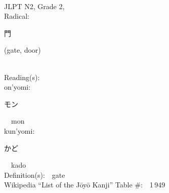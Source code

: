 \begin{multicols}{2}
{\fontsize{34pt}{40pt}  }\ \ \\  %
{JLPT N2, Grade 2, \\Radical:\ \ {\begin{CJK}{UTF8}{min} 門 \end{CJK}} (gate, door) } \\
Reading(s):\ \ \\
{\hspace*{1em}}on'yomi:\ \ \\
{\hspace*{2em}}{\begin{CJK}{UTF8}{min} モン \end{CJK}}\ \ mon\ \ \\
{\hspace*{1em}}kun'yomi:\ \ \\
{\hspace*{2em}}{\begin{CJK}{UTF8}{min} かど \end{CJK}}\ \ kado\ \ \\
Definition(s):\ \ gate \\
Wikipedia ``List of the J\=oy\=o Kanji'' Table \#:\ \ 1\,949 \\
\ \ \\
\end{multicols}



